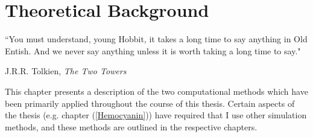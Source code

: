 \chapter{Theoretical Background}
\label{Introduction}
%
\epigraph{``You must understand, young Hobbit, it takes a long time to say anything in Old Entish. And we never say anything unless it is worth taking a long time to say."}{J.R.R. Tolkien, \textit{The Two Towers}}
%
This chapter presents a description of the two computational methods which have been primarily applied throughout the course of this thesis.  Certain aspects of the thesis (e.g. chapter (\ref{Hemocyanin})) have required that I use other simulation methods, and these methods are outlined in the respective chapters.
